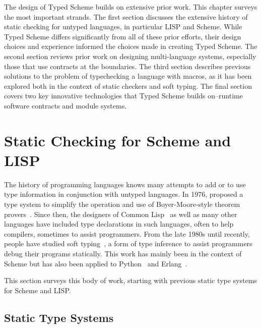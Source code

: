 \begin{schemeregion}
\label{chap:prior}

The design of Typed Scheme builds on extensive prior work. This
chapter surveys the most important strands. The first
section discusses the extensive history of static checking for
untyped languages, in particular LISP and Scheme.  While Typed Scheme
differs significantly from all of these prior efforts, their design
choices and experience informed the choices made in creating Typed
Scheme.
%
The second section reviews prior work on designing multi-language
systems, especially those that use contracts at the boundaries.  
%
The third section describes previous solutions to the
problem of typechecking a language with macros, 
as it has been explored both in the context of static checkers and soft
typing.  
%
The final section covers two key innovative technologies that
Typed Scheme builds on--runtime software contracts and module
systems.  

\section{Static Checking for Scheme and LISP}

The history of programming languages knows many attempts to add or to
use type information in conjunction with untyped languages. 
In 1976, \citet{c:typed-lisp} proposed a type system to
simplify the operation and use of Boyer-Moore-style theorem
provers~\cite{boyer-moore97}.   
Since then, the designers of Common Lisp~\cite{cl2} as well as many
other languages have included type
declarations in such languages, often to help compilers, sometimes to
assist programmers. From the late 1980s until recently, people have
studied soft
typing~\cite{cf:pldi91,awl:popl94,wc:toplas97,hr:fpca95,ff:toplas99,mff:popl06},
a form of type inference to assist programmers debug their programs
statically.  This work has mainly been in the context of Scheme but
has also been applied to Python~\cite{some-mit-ms-thesis} and Erlang~\cite{mw:erlang}. 

This section surveys this body of work, starting with previous static
type systems for Scheme and LISP. 

 \subsection{Static Type Systems}


\end{schemeregion}

